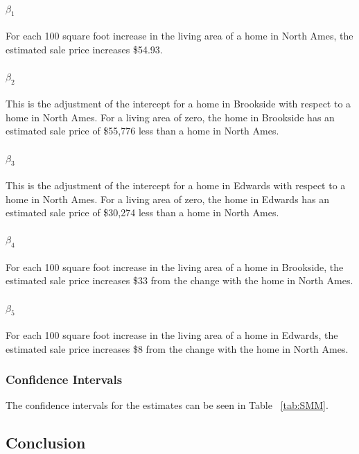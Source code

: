\documentclass[11pt]{scrartcl} %
\begin{document}
\paragraph{$\beta_1$}For each 100 square foot increase in the living area of a home in North Ames, the estimated sale price increases \$54.93.
\paragraph{$\beta_2$}This is the adjustment of the intercept for a home in Brookside with respect to a home in North Ames. For a living area of zero, the home in Brookside has an estimated sale price of \$55,776 less than a home in North Ames.
\paragraph{$\beta_3$}This is the adjustment of the intercept for a home in Edwards with respect to a home in North Ames. For a living area of zero, the home in Edwards has an estimated sale price of \$30,274 less than a home in North Ames.
\paragraph{$\beta_4$}For each 100 square foot increase in the living area of a home in Brookside, the estimated sale price increases \$33 from the change with the home in North Ames.
\paragraph{$\beta_5$}For each 100 square foot increase in the living area of a home in Edwards, the estimated sale price increases \$8 from the change with the home in North Ames.
\subsubsection{Confidence Intervals}
The confidence intervals for the estimates can be seen in Table ~\ref{tab:SMM}. 

\subsection{Conclusion}
\end{document}
